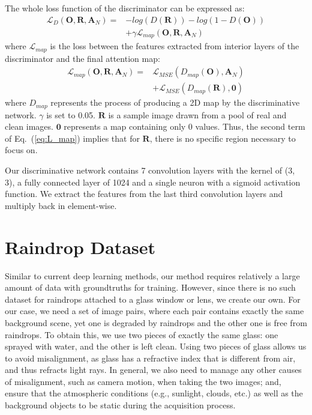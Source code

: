 \documentclass[10pt,twocolumn,letterpaper]{article}
\begin{document}
The whole loss function of the discriminator can be expressed as:
\begin{equation}
\label{eq_dis}
\begin{split}
\mathcal{L}_{D}(\mathbf{O},\mathbf{R}, \mathbf{A}_N) = &-log(D(\mathbf{R})) -log(1 - D(\mathbf{O})) \\
&+ \gamma \mathcal{L}_{map}(\mathbf{O}, \mathbf{R},  \mathbf{A}_N)
\end{split}
\end{equation}
where $\mathcal{L}_{map}$ is the loss between the features extracted from interior layers of the discriminator and the final attention map:
\begin{equation}
\begin{split}
\mathcal{L}_{map}(\mathbf{O},\mathbf{R}, \mathbf{A}_N) = &\mathcal{L}_{MSE}(D_{map}(\mathbf{O}), \mathbf{A}_N) \\
&+\mathcal{L}_{MSE}(D_{map}(\mathbf{R}), \mathbf{0})
\label{eq:L_map}
\end{split}
\end{equation}
where $D_{map}$ represents the process of producing a 2D map by the discriminative network. $\gamma$ is set to 0.05. $\mathbf{R}$ is a sample image drawn from a pool of real and clean images. $\mathbf{0}$ represents a map containing only 0 values. Thus, the second term of Eq.~(\ref{eq:L_map}) implies  that for $\mathbf{R}$, there is no specific region necessary to focus on. 

Our discriminative network contains 7 convolution layers with the kernel of (3, 3), a fully connected layer of 1024 and a single neuron with a sigmoid activation function. We extract the features from the last third convolution layers and multiply back in element-wise. 

\section{Raindrop Dataset}
\label{sec:dataset}
Similar to current deep learning methods, our method requires relatively a large amount of  data with groundtruths for training. However, since there is no such dataset for raindrops attached to a glass window or lens, we create our own. 
For our case, we need a set of image pairs, where each pair contains exactly the same background scene, yet one is degraded by raindrops and the other one is free from raindrops. To obtain this, we use two pieces of exactly the same glass: one sprayed with water, and the other is left clean. Using two pieces of glass allows us to avoid misalignment, as glass has a refractive index that is different from air, and thus refracts light rays. In general, we also need to manage any other causes of misalignment, such as camera motion, when taking the two images; and, ensure that the atmospheric conditions (e.g., sunlight, clouds, etc.) as well as  the background objects to be static during the acquisition process.
\end{document}
